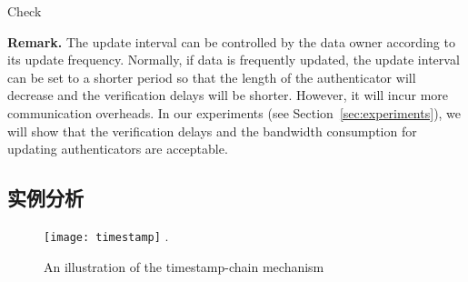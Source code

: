 \begin{algorithm}[t]
  \caption{Check}
  \label{alg:check}
  \begin{algorithmic}[1]
              \ENDIF
                    \ENDIF
                \ENDFOR
                \ELSE
                \ENDIF
              \ELSE
              \ENDIF
  \end{algorithmic}
\end{algorithm}

\noindent \textbf{Remark.} The update interval can be controlled by the data owner according to its update frequency. Normally, if data is frequently updated, the update interval can be set to a shorter period so that the length of the authenticator will decrease and the verification delays will be shorter. However, it will incur more communication overheads.
In our experiments (see Section~\ref{sec:experiments}), we will show that the verification delays and the bandwidth consumption for updating authenticators are acceptable.

\subsection{实例分析}
\begin{figure}[htb]
  \centering
  \texttt{[image: timestamp]}
  \DeclareGraphicsExtensions.
  \caption{An illustration of the timestamp-chain mechanism}
  \label{fig:timestamp}
\end{figure}


